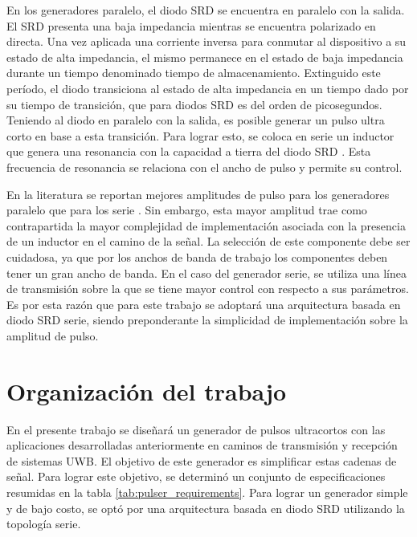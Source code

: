 En los generadores paralelo, el diodo SRD se encuentra en paralelo con la
salida. El SRD presenta una baja impedancia mientras se encuentra polarizado en
directa. Una vez aplicada una corriente inversa para conmutar al dispositivo a
su estado de alta impedancia, el mismo permanece en el estado de baja impedancia
durante un tiempo denominado tiempo de almacenamiento. Extinguido este período,
el diodo transiciona al estado de alta impedancia en un tiempo dado por su
tiempo de transición, que para diodos SRD es del orden de picosegundos. Teniendo
al diodo en paralelo con la salida, es posible generar un pulso ultra corto en
base a esta transición. Para lograr esto, se coloca en serie un inductor que
genera una resonancia con la capacidad a tierra del diodo SRD \cite{Hall1966}.
Esta frecuencia de resonancia se relaciona con el ancho de pulso y permite su
control.

En la literatura se reportan mejores amplitudes de pulso para los generadores
paralelo que para los serie \cite{han2005}. Sin embargo, esta mayor amplitud
trae como contrapartida la mayor complejidad de implementación asociada con la
presencia de un inductor en el camino de la señal. La selección de este
componente debe ser cuidadosa, ya que por los anchos de banda de trabajo los
componentes deben tener un gran ancho de banda. En el caso del generador serie,
se utiliza una línea de transmisión sobre la que se tiene mayor control con
respecto a sus parámetros. Es por esta razón que para este trabajo se adoptará
una arquitectura basada en diodo SRD serie, siendo preponderante la simplicidad
de implementación sobre la amplitud de pulso.


\section{Organización del trabajo}

En el presente trabajo se diseñará un generador de pulsos ultracortos con
las aplicaciones desarrolladas anteriormente en caminos de transmisión y
recepción de sistemas UWB. El objetivo de este generador es simplificar estas
cadenas de señal. Para lograr este objetivo, se determinó un conjunto de
especificaciones resumidas en la tabla \ref{tab:pulser_requirements}. Para
lograr un generador simple y de bajo costo, se optó por una arquitectura basada
en diodo SRD utilizando la topología serie.

